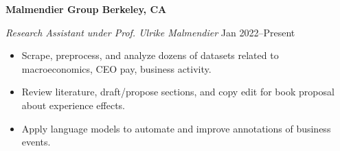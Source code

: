 \textbf{Malmendier Group \hfill Berkeley, CA}\par

\textit{Research Assistant under Prof. Ulrike Malmendier} \hfill Jan 2022--Present \par
\begin{itemize}
	\item Scrape, preprocess, and analyze dozens of datasets related to macroeconomics, CEO pay, business activity.
	\item Review literature, draft/propose sections, and copy edit for book proposal about experience effects.
	\item Apply language models to automate and improve annotations of business events.
\end{itemize}\par